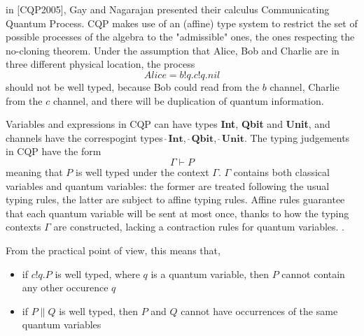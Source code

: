 in [CQP2005], Gay and Nagarajan presented their calculus Communicating Quantum Process. CQP makes use of an (affine) type system to restrict the set of possible processes of the algebra to the "admissible" ones, the ones respecting the no-cloning theorem. Under the assumption that Alice, Bob and Charlie are in three different physical location, the process \[Alice = b!q.c!q.nil\] should not be well typed, because Bob could read from the $b$ channel, Charlie from the $c$ channel, and there will be duplication of quantum information.


Variables and expressions in CQP can have types \textbf{Int}, \textbf{Qbit} and \textbf{Unit}, and channels have the correspogint types $\widehat{\ }\textbf{Int}$, $\widehat{\ }\textbf{Qbit}$, $\widehat{\ }\textbf{Unit}$.
The typing judgements in CQP have the form \[\Gamma \vdash P\] meaning that $P$ is well typed under the context $\Gamma$. $\Gamma$ contains both classical variables and quantum variables: the former are treated following the usual typing rules, the latter are subject to affine typing rules. Affine rules guarantee that each quantum variable will be sent at most once, thanks to how the typing contexts $\Gamma$ are constructed, lacking a contraction rules for quantum variables. .


From the practical point of view, this means that, \begin{itemize} 
\item if $c!q.P$ is well typed, where $q$ is a quantum variable, then $P$ cannot contain any other occurence $q$
\item if $P \parallel Q$ is well typed, then $P$ and $Q$ cannot have occurrences of the same quantum variables
\end{itemize}



